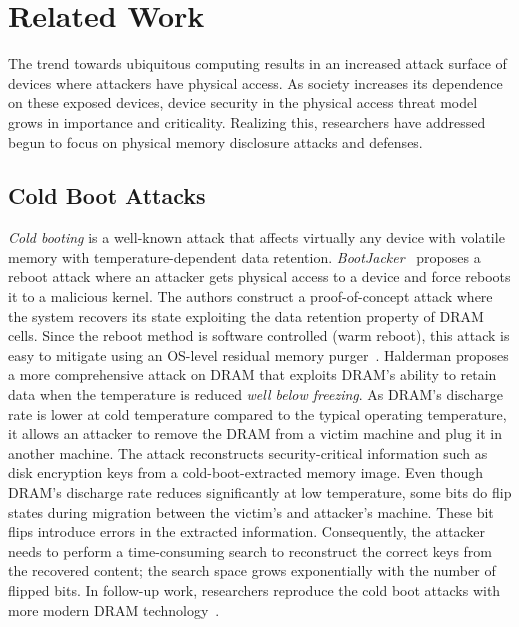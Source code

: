 \section{Related Work}
\label{sec_related_works}

The trend towards ubiquitous computing results in an increased attack surface of devices where attackers have physical access.
As society increases its dependence on these exposed devices, device security in the physical access threat model grows in importance and criticality.
Realizing this, researchers have addressed begun to focus on physical memory disclosure attacks and defenses. 

\subsection{Cold Boot Attacks}

\textit{Cold booting} is a well-known attack that affects virtually any device with volatile memory with temperature-dependent data retention.
\textit{BootJacker}~\cite{chan_bootjacker_2008} proposes a reboot attack where an attacker gets physical access to a device and force reboots it to a malicious kernel. 
The authors construct a proof-of-concept attack where the system recovers its state exploiting the data retention property of DRAM cells. 
Since the reboot method is software controlled (\ie warm reboot), this attack is easy to mitigate using an OS-level residual memory purger~\cite{computing2009tcg}.
Halderman \etal \cite{halderman2009lest} proposes a more comprehensive attack on DRAM that exploits DRAM's ability to retain data when the temperature is reduced \textit{well below freezing}.  
As DRAM's discharge rate is lower at cold temperature compared to the typical operating temperature, it allows an attacker to remove the DRAM from a victim machine and plug it in another machine. 
The attack reconstructs security-critical information such as disk encryption keys from a cold-boot-extracted memory image. 
Even though DRAM's discharge rate reduces significantly at low temperature, some bits do flip states during migration between the victim's and attacker's machine.
These bit flips introduce errors in the extracted information. 
Consequently, the attacker needs to perform a time-consuming search to reconstruct the correct keys from the recovered content; the search space grows exponentially with the number of flipped bits. 
In follow-up work, researchers reproduce the cold boot attacks with more modern DRAM technology~\cite{lindenlauf2015cold,bauer2016lest}.

